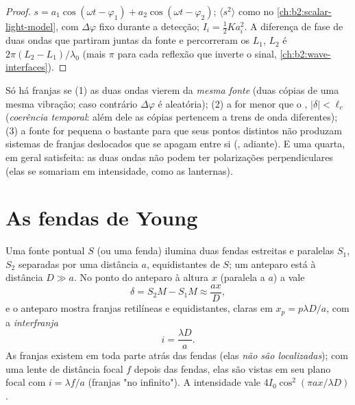 \begin{proof}
$s = a_1\cos(\omega t - \varphi_1) + a_2\cos(\omega t - \varphi_2)$; $\langle s^2\rangle$ como no
\cref{ch:b2:scalar-light-model}, com $\Delta\varphi$ fixo durante a
detecção; $I_i = \tfrac12Ka_i^2$. A diferença de fase de duas ondas
que partiram juntas da fonte e percorreram os  $L_1$, $L_2$ é
$2\pi(L_2 - L_1)/\lambda_0$ (mais $\pi$ para cada reflexão que inverte o
sinal, \cref{ch:b2:wave-interfaces}).
\end{proof}

\begin{remark}\label{rem:b2:two-wave-interference:conditions}
Só há franjas se (1) as duas ondas vierem da \emph{mesma
fonte} (duas cópias de uma mesma vibração; caso contrário $\Delta\varphi$ é aleatória); (2)
a  for menor que o , $|\delta| < \ell_c$
(\emph{coerência temporal}: além dele as cópias pertencem a trens de
onda diferentes); (3) a fonte for pequena o bastante para que seus pontos
distintos não produzam sistemas de franjas deslocados que se apagam entre si
(\emph{}, adiante). E uma quarta, em geral satisfeita: as
duas ondas não podem ter polarizações perpendiculares (elas se somariam
em intensidade, como as lanternas).
\end{remark}

\section{As fendas de Young}

\begin{proposition}\label{prop:b2:two-wave-interference:young}
Uma fonte pontual $S$ (ou uma fenda) ilumina duas fendas estreitas e paralelas
$S_1$, $S_2$ separadas por uma distância $a$, equidistantes de $S$; um anteparo está à
distância $D \gg a$. No ponto do anteparo à altura $x$ (paralela
a $a$) a  vale
\[
\delta = S_2M - S_1M \approx \frac{ax}D ,
\]
e o anteparo mostra franjas retilíneas e equidistantes, claras em $x_p =
p\lambda D/a$, com a \emph{interfranja}
\[
i = \frac{\lambda D}a .
\]
As franjas existem em toda parte atrás das fendas (elas \emph{não são
localizadas}); com uma lente de distância focal $f$ depois das fendas, elas são
vistas em seu plano focal com $i = \lambda f/a$ (franjas "no infinito").
A intensidade vale $4I_0\cos^2(\pi ax/\lambda D)$.
\end{proposition}


